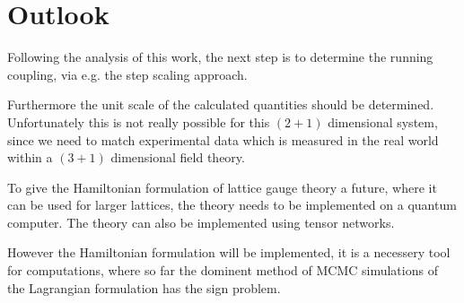 \section{Outlook}
Following the analysis of this work, the next step is to determine the running coupling, via e.g. the step scaling approach.\cite{crippa2024}

Furthermore the unit scale of the calculated quantities should be determined. Unfortunately this is not really possible for this $(2+1)$ dimensional system, since we need to match experimental data which is measured in the real world within a $(3+1)$ dimensional field theory.

To give the Hamiltonian formulation of lattice gauge theory a future, where it can be used for larger lattices, the theory needs to be implemented on a quantum computer.\cite{crippa2024} The theory can also be implemented using tensor networks.\cite{wu2025accurategaugeinvarianttensornetwork, Singh_2011}

However the Hamiltonian formulation will be implemented, it is a necessery tool for computations, where so far the dominent method of MCMC simulations of the Lagrangian formulation has the sign problem. \cite{Garofalo:2024VV}
